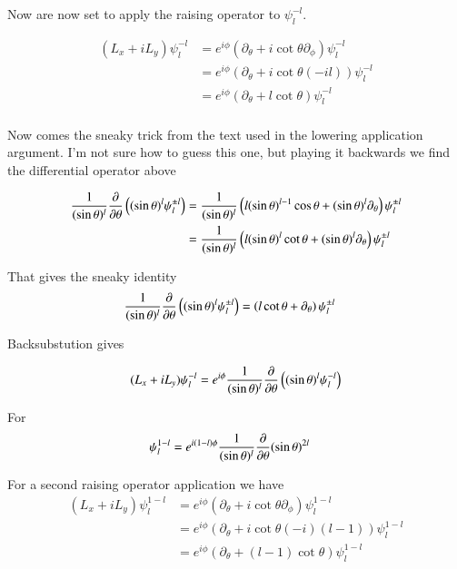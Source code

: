 Now are now set to apply the raising operator to $\psi_l^{-l}$.

\begin{align*}
(L_x + iL_y) \psi_l^{-l} 
&=
e^{i\phi} (\partial_\theta + i \cot\theta \partial_\phi) \psi_l^{-l} \\
&=
e^{i\phi} (\partial_\theta + i \cot\theta (-i l)) \psi_l^{-l} \\
&=
e^{i\phi} (\partial_\theta + l \cot\theta ) \psi_l^{-l} \\
\end{align*}

Now comes the sneaky trick from the text used in the lowering application argument.  I'm not sure how to guess this one, but playing it backwards we find the differential operator above

\begin{align*}
\frac{1}{(\sin\theta)^l} \frac{\partial {}}{\partial {\theta}} \left( (\sin\theta)^l \psi_l^{\pm l} \right)
&=
\frac{1}{(\sin\theta)^l} \left( l (\sin\theta)^{l-1} \cos\theta + (\sin\theta)^l \partial_\theta \right) \psi_l^{\pm l} \\
&=
\frac{1}{(\sin\theta)^l} \left( l (\sin\theta)^{l} \cot\theta + (\sin\theta)^l \partial_\theta \right) \psi_l^{\pm l} \\
\end{align*}

That gives the sneaky identity
\begin{align}\label{eqn:sneaky}
\frac{1}{(\sin\theta)^l} \frac{\partial {}}{\partial {\theta}} \left( (\sin\theta)^l \psi_l^{\pm l} \right)
&=
\left( l \cot\theta + \partial_\theta \right) \psi_l^{\pm l} 
\end{align}

Backsubstution gives

\begin{align*}
(L_x + iL_y) \psi_l^{-l} 
&=
e^{i\phi} \frac{1}{(\sin\theta)^l} \frac{\partial {}}{\partial {\theta}} \left( (\sin\theta)^l \psi_l^{-l} \right) \\
\end{align*}

For
\begin{align}\label{eqn:minusLplus1}
\psi_l^{1-l}
&=
e^{i(1-l)\phi} \frac{1}{(\sin\theta)^l} \frac{\partial {}}{\partial {\theta}} (\sin\theta)^{2l}
\end{align}

For a second raising operator application we have
\begin{align*}
(L_x + iL_y) \psi_l^{1-l} 
&=
e^{i\phi} (\partial_\theta + i \cot\theta \partial_\phi) \psi_l^{1-l} \\
&=
e^{i\phi} (\partial_\theta + i \cot\theta (-i)(l-1)) \psi_l^{1-l} \\
&=
e^{i\phi} (\partial_\theta + (l-1)\cot\theta ) \psi_l^{1-l} \\
\end{align*}


